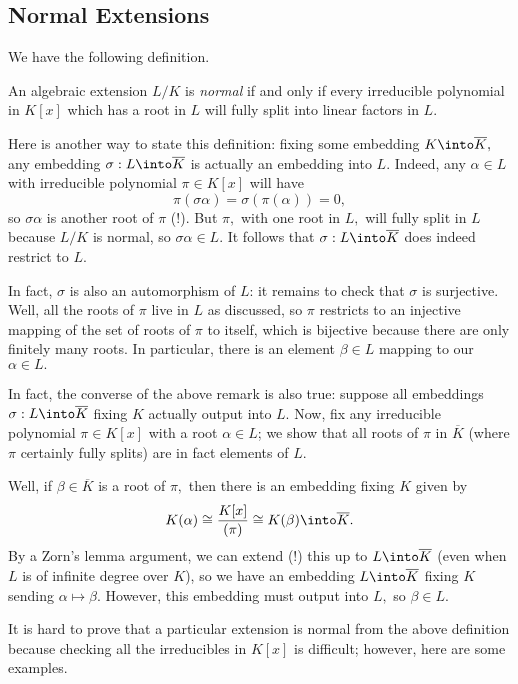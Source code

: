 \subsection{Normal Extensions}
We have the following definition.
\begin{definition}
	An algebraic extension $L/K$ is \textit{normal} if and only if every irreducible polynomial in $K[x]$ which has a root in $L$ will fully split into linear factors in $L.$
\end{definition}
\begin{remark}[Nir] \label{rem:embedisauto}
	Here is another way to state this definition: fixing some embedding $K\into\overline K,$ any embedding $\sigma:L\into\overline K$ is actually an embedding into $L.$ Indeed, any $\alpha\in L$ with irreducible polynomial $\pi\in K[x]$ will have
	\[\pi(\sigma\alpha)=\sigma(\pi(\alpha))=0,\]
	so $\sigma\alpha$ is another root of $\pi$ (!). But $\pi,$ with one root in $L,$ will fully split in $L$ because $L/K$ is normal, so $\sigma\alpha\in L.$ It follows that $\sigma:L\into\overline K$ does indeed restrict to $L.$

	In fact, $\sigma$ is also an automorphism of $L$: it remains to check that $\sigma$ is surjective. Well, all the roots of $\pi$ live in $L$ as discussed, so $\pi$ restricts to an injective mapping of the set of roots of $\pi$ to itself, which is bijective because there are only finitely many roots. In particular, there is an element $\beta\in L$ mapping to our $\alpha\in L.$
\end{remark}
\begin{remark}[Nir] \label{rem:embedisautoconv}
	In fact, the converse of the above remark is also true: suppose all embeddings $\sigma:L\into\overline K$ fixing $K$ actually output into $L.$ Now, fix any irreducible polynomial $\pi\in K[x]$ with a root $\alpha\in L$; we show that all roots of $\pi$ in $\overline K$ (where $\pi$ certainly fully splits) are in fact elements of $L.$

	Well, if $\beta\in\overline K$ is a root of $\pi,$ then there is an embedding fixing $K$ given by
	\[K(\alpha)\cong\frac{K[x]}{(\pi)}\cong K(\beta)\into\overline K.\]
	By a Zorn's lemma argument, we can extend (!) this up to $L\into\overline K$ (even when $L$ is of infinite degree over $K$), so we have an embedding $L\into\overline K$ fixing $K$ sending $\alpha\mapsto\beta.$ However, this embedding must output into $L,$ so $\beta\in L.$
\end{remark}
It is hard to prove that a particular extension is normal from the above definition because checking all the irreducibles in $K[x]$ is difficult; however, here are some examples.
